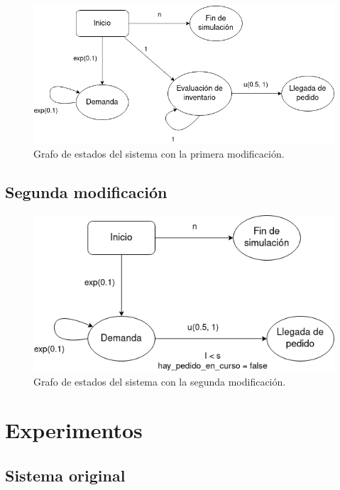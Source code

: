 \documentclass[12pt, spanish]{article}
\begin{document}
\begin{figure}[H]
  \centering
   \includegraphics[width=\textwidth]{grafo_sucesos_mod1.png}
	\caption{Grafo de estados del sistema con la primera modificación.}
\end{figure}


\subsection{Segunda modificación}

\begin{figure}[H]
  \centering
   \includegraphics[width=\textwidth]{grafo_sucesos_mod2.png}
	\caption{Grafo de estados del sistema con la segunda modificación.}
\end{figure}




\section{Experimentos}


\subsection{Sistema original}
\end{document}
